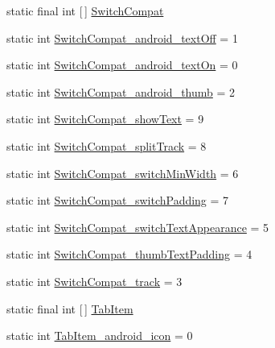 \begin{DoxyCompactItemize}
\item 
static final int \mbox{[}$\,$\mbox{]} \hyperlink{classandroid_1_1support_1_1v7_1_1mediarouter_1_1R_1_1styleable_af5c7f83276b6c88619833dc8bebeacd9}{Switch\+Compat}
\item 
static int \hyperlink{classandroid_1_1support_1_1v7_1_1mediarouter_1_1R_1_1styleable_af14c1d76d2ab92ed4bfcba65bd4631ac}{Switch\+Compat\+\_\+android\+\_\+text\+Off} = 1
\item 
static int \hyperlink{classandroid_1_1support_1_1v7_1_1mediarouter_1_1R_1_1styleable_a2cb5bc58388a9257700ecc950397dd9e}{Switch\+Compat\+\_\+android\+\_\+text\+On} = 0
\item 
static int \hyperlink{classandroid_1_1support_1_1v7_1_1mediarouter_1_1R_1_1styleable_a73c6dc6f08ec175df6b39b3bbe5e4b9d}{Switch\+Compat\+\_\+android\+\_\+thumb} = 2
\item 
static int \hyperlink{classandroid_1_1support_1_1v7_1_1mediarouter_1_1R_1_1styleable_af24f7da08cafd932e8fb474f0845baf4}{Switch\+Compat\+\_\+show\+Text} = 9
\item 
static int \hyperlink{classandroid_1_1support_1_1v7_1_1mediarouter_1_1R_1_1styleable_a318ab94a649fd9ebfa42612d0c77726c}{Switch\+Compat\+\_\+split\+Track} = 8
\item 
static int \hyperlink{classandroid_1_1support_1_1v7_1_1mediarouter_1_1R_1_1styleable_a352987fa61ad38cf9d576099efe2ad26}{Switch\+Compat\+\_\+switch\+Min\+Width} = 6
\item 
static int \hyperlink{classandroid_1_1support_1_1v7_1_1mediarouter_1_1R_1_1styleable_a91af30593f8a1dbd3a82d1b6df6ae8b8}{Switch\+Compat\+\_\+switch\+Padding} = 7
\item 
static int \hyperlink{classandroid_1_1support_1_1v7_1_1mediarouter_1_1R_1_1styleable_a7b7c45a6e2f6226aaece7ebb5417ffcb}{Switch\+Compat\+\_\+switch\+Text\+Appearance} = 5
\item 
static int \hyperlink{classandroid_1_1support_1_1v7_1_1mediarouter_1_1R_1_1styleable_a02e44ff90f9d164c673496e2b783fb7d}{Switch\+Compat\+\_\+thumb\+Text\+Padding} = 4
\item 
static int \hyperlink{classandroid_1_1support_1_1v7_1_1mediarouter_1_1R_1_1styleable_a7d3a42dee16a25712492d2908119800b}{Switch\+Compat\+\_\+track} = 3
\item 
static final int \mbox{[}$\,$\mbox{]} \hyperlink{classandroid_1_1support_1_1v7_1_1mediarouter_1_1R_1_1styleable_a42bb997a8b3e8b983afbbea7a8ee301a}{Tab\+Item}
\item 
static int \hyperlink{classandroid_1_1support_1_1v7_1_1mediarouter_1_1R_1_1styleable_a93a215dbebe4252257e23a87bda5e437}{Tab\+Item\+\_\+android\+\_\+icon} = 0

\end{DoxyCompactItemize}
